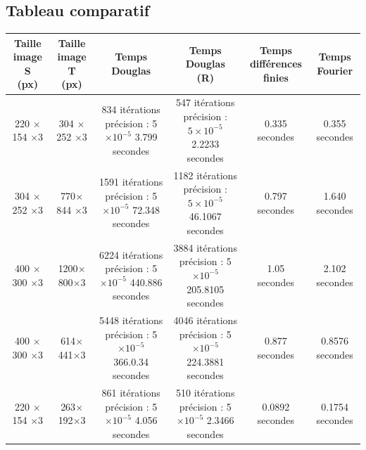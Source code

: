 \subsection{Tableau comparatif}
\begin{tabular}{|c|c|c|c|c|c|}
\hline
\shortstack{Taille image S \\(px)} & \shortstack{Taille image T \\(px)} & Temps Douglas & \shortstack{Temps Douglas \\(R)} &\shortstack{Temps différences\\ finies} & Temps Fourier\\
\hline
220 $\times$ 154 $\times$3 & 304 $\times $252 $\times $3 &  \shortstack{ 834 itérations\\ précision : 5$\times 10^{-5}$\\3.799 secondes} &\shortstack{ 547 itérations\\
précision : $5 \times 10^{-5}$\\ 2.2233 secondes}&  0.335 secondes & 0.355 secondes \\

\hline
304 $\times$ 252 $\times$3 & 770$\times$844 $\times $3 & \shortstack{ 1591 itérations\\ précision : 5$\times 10^{-5}$\\72.348 secondes} & \shortstack{ 1182 itérations\\
précision : $5 \times 10^{-5}$\\ 46.1067 secondes} & 0.797 secondes & 1.640 secondes \\
\hline
400 $\times$ 300 $\times$3 & 1200$\times$800$\times $3 & \shortstack{ 6224 itérations\\ précision : 5$\times 10^{-5}$\\440.886 secondes} &\shortstack{3884 itérations\\ précision : 5$\times 10^{-5}$\\205.8105 secondes} &1.05 secondes & 2.102 secondes \\
\hline
400 $\times$ 300 $\times$3 & 614$\times$441$\times $3 & \shortstack{ 5448 itérations\\ précision : 5$\times 10^{-5}$\\366.0.34 secondes}&\shortstack{4046 itérations\\ précision : 5$\times 10^{-5}$\\224.3881 secondes} & 0.877 secondes & 0.8576 secondes \\
\hline
220 $\times$ 154 $\times$3 & 263$\times$192$\times $3 & \shortstack{ 861 itérations\\ précision : 5$\times 10^{-5}$\\4.056 secondes} &\shortstack{510 itérations\\ précision : 5$\times 10^{-5}$\\2.3466 secondes}& 0.0892 secondes & 0.1754 secondes \\
\hline
\end{tabular}\\
